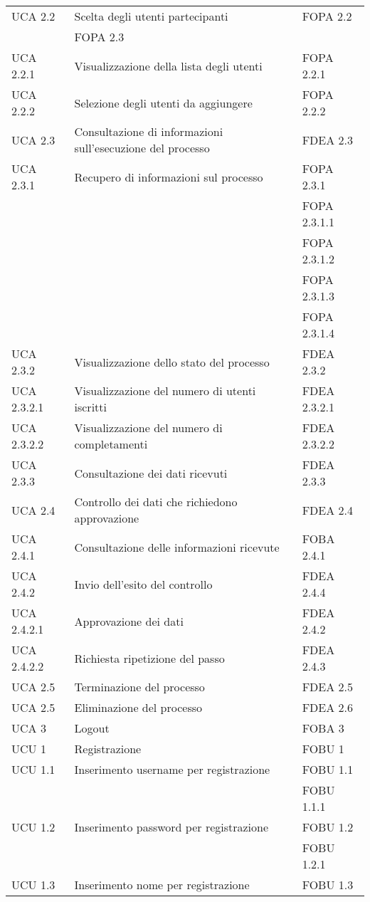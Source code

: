 \begin{longtable}{lXp{}}
\midrule
UCA 2.2&Scelta degli utenti partecipanti&FOPA 2.2\\
&FOPA 2.3\\
\midrule
UCA 2.2.1&Visualizzazione della lista degli utenti&FOPA 2.2.1\\
\midrule
UCA 2.2.2&Selezione degli utenti da aggiungere&FOPA 2.2.2\\
\midrule
UCA 2.3&Consultazione di informazioni sull'esecuzione del processo&FDEA 2.3\\
\midrule
UCA 2.3.1&Recupero di informazioni sul processo&FOPA 2.3.1\\
&&FOPA 2.3.1.1\\
&&FOPA 2.3.1.2\\
&&FOPA 2.3.1.3\\
&&FOPA 2.3.1.4\\
\midrule
UCA 2.3.2&Visualizzazione dello stato del processo&FDEA 2.3.2\\
\midrule
UCA 2.3.2.1&Visualizzazione del numero di utenti iscritti&FDEA 2.3.2.1\\
\midrule
UCA 2.3.2.2&Visualizzazione del numero di completamenti&FDEA 2.3.2.2\\
\midrule
UCA 2.3.3&Consultazione dei dati ricevuti&FDEA 2.3.3\\
\midrule
UCA 2.4&Controllo dei dati che richiedono approvazione&FDEA 2.4\\
\midrule
UCA 2.4.1&Consultazione delle informazioni ricevute&FOBA 2.4.1\\
\midrule
UCA 2.4.2&Invio dell'esito del controllo&FDEA 2.4.4\\
\midrule
UCA 2.4.2.1&Approvazione dei dati&FDEA 2.4.2\\
\midrule
UCA 2.4.2.2&Richiesta ripetizione del passo&FDEA 2.4.3\\
\midrule
UCA 2.5&Terminazione del processo&FDEA 2.5\\
\midrule
UCA 2.5&Eliminazione del processo&FDEA 2.6\\
\midrule
UCA 3&Logout&FOBA 3\\
\midrule
UCU 1&Registrazione&FOBU 1\\ 
\midrule 
UCU 1.1&Inserimento username per registrazione&FOBU 1.1\\ 
&&FOBU 1.1.1\\
\midrule 
UCU 1.2&Inserimento password per registrazione&FOBU 1.2\\ 
&&FOBU 1.2.1\\ 
\midrule 
UCU 1.3&Inserimento nome per registrazione&FOBU 1.3\\ 

\end{longtable}
